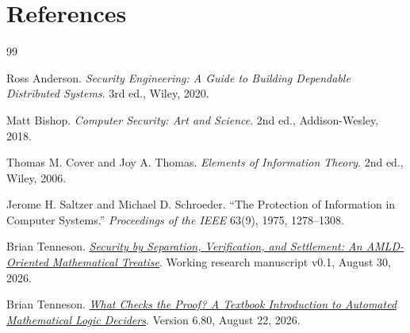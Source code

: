 \documentclass[11pt,oneside]{book}
\theoremstyle{definition}
\theoremstyle{remark}
\begin{document}
\chapter*{References}
\begin{thebibliography}{99}

Ross Anderson.
\newblock \emph{Security Engineering: A Guide to Building Dependable Distributed Systems}.
\newblock 3rd ed., Wiley, 2020.

Matt Bishop.
\newblock \emph{Computer Security: Art and Science}.
\newblock 2nd ed., Addison-Wesley, 2018.

Thomas M. Cover and Joy A. Thomas.
\newblock \emph{Elements of Information Theory}.
\newblock 2nd ed., Wiley, 2006.

Jerome H. Saltzer and Michael D. Schroeder.
\newblock ``The Protection of Information in Computer Systems.''
\newblock \emph{Proceedings of the IEEE} 63(9), 1975, 1278--1308.

Brian Tenneson.
\newblock \href{https://btenneson.github.io/pub/papers/amld_security_treatise_v0_1/}
{\emph{Security by Separation, Verification, and Settlement: An AMLD-Oriented Mathematical Treatise}}.
\newblock Working research manuscript v0.1, August 30, 2026.

Brian Tenneson.
\newblock \href{https://btenneson.github.io/pub/papers/what_checks_the_proof_v6_80/}
{\emph{What Checks the Proof? A Textbook Introduction to Automated Mathematical Logic Deciders}}.
\newblock Version 6.80, August 22, 2026.

\end{thebibliography}

\clearpage
\thispagestyle{empty}
\vspace*{0.66\textheight}
\begin{center}
\end{center}
\end{document}
